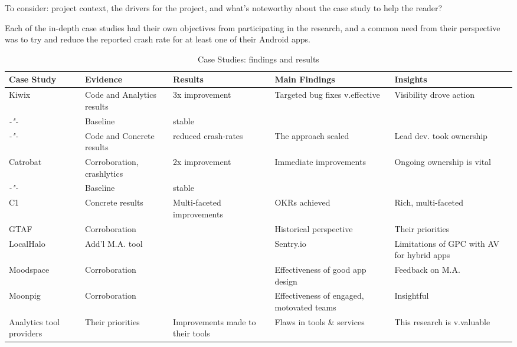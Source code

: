 To consider: project context, the drivers for the project, and what's noteworthy about the case study to help the reader?

Each of the in-depth case studies had their own objectives from participating in the research, and a common need from their perspective was to try and reduce the reported crash rate for at least one of their Android apps.

\begin{landscape} %
\begin{table}
    \centering
    \tabcolsep=0.06cm
    \tiny
    \begin{tabular}{lllll}\toprule
    Case Study                  &Evidence    &Results               &Main Findings             &Insights  \\
    \midrule
    Kiwix                       &Code and Analytics results &3x improvement        &Targeted bug fixes v.effective &Visibility drove action \\ 
     \textit{-"-}               &Baseline         &stable                &                     & \\
     \textit{-"-}               &Code and Concrete results &reduced crash-rates   &The approach scaled  &Lead dev. took ownership \\
     \midrule
    Catrobat                    &Corroboration, crashlytics &2x improvement     &Immediate improvements &Ongoing ownership is vital \\
     \textit{-"-}               &Baseline         &stable                &                     & \\
     \midrule
    C1                          &Concrete results &Multi-faceted improvements &OKRs achieved & Rich, multi-faceted \\
    GTAF                        &Corroboration    &                      &Historical perspective &Their priorities  \\
    LocalHalo                   &Add'l M.A. tool  &                      &Sentry.io &Limitations of GPC with AV for hybrid apps \\
    Moodspace                   &Corroboration    &                      &Effectiveness of good app design &Feedback on M.A. \\
    Moonpig                     &Corroboration    &                      &Effectiveness of engaged, motovated teams &Insightful \\
    Analytics tool providers    &Their priorities &Improvements made to their tools & Flaws in tools \& services &This research is v.valuable \\
    \bottomrule
    \end{tabular}
    \caption{Case Studies: findings and results}
    \label{tab:empirical-studies-findings-and-results}
\end{table}
\end{landscape}

